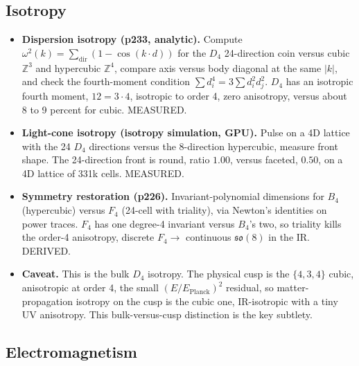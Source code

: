 \subsection{Isotropy}

\begin{itemize}
  \item \textbf{Dispersion isotropy (p233, analytic).} Compute
  $\omega^2(k) = \sum_{\mathrm{dir}} (1 - \cos(k \cdot d))$ for the $D_4$ 24-direction coin versus cubic
  $\mathbb{Z}^3$ and hypercubic $\mathbb{Z}^4$, compare axis versus body diagonal at the same $|k|$, and check the
  fourth-moment condition $\sum d_i^4 = 3 \sum d_i^2 d_j^2$. $D_4$ has an isotropic fourth moment, $12 = 3 \cdot
  4$, isotropic to order 4, zero anisotropy, versus about 8 to 9 percent for cubic. MEASURED.
  \item \textbf{Light-cone isotropy (isotropy simulation, GPU).} Pulse on a 4D lattice with the 24 $D_4$
  directions versus the 8-direction hypercubic, measure front shape. The 24-direction front is round, ratio
  $1.00$, versus faceted, $0.50$, on a 4D lattice of 331k cells. MEASURED.
  \item \textbf{Symmetry restoration (p226).} Invariant-polynomial dimensions for $B_4$ (hypercubic) versus $F_4$
  (24-cell with triality), via Newton's identities on power traces. $F_4$ has one degree-4 invariant versus
  $B_4$'s two, so triality kills the order-4 anisotropy, discrete $F_4 \to$ continuous $\mathfrak{so}(8)$ in the
  IR. DERIVED.
  \item \textbf{Caveat.} This is the bulk $D_4$ isotropy. The physical cusp is the $\{4,3,4\}$ cubic, anisotropic
  at order 4, the small $(E/E_{\mathrm{Planck}})^2$ residual, so matter-propagation isotropy on the cusp is the
  cubic one, IR-isotropic with a tiny UV anisotropy. This bulk-versus-cusp distinction is the key subtlety.
\end{itemize}

\subsection{Electromagnetism}

